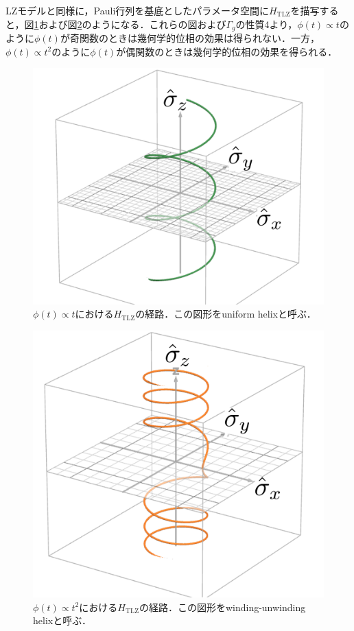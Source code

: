 LZモデルと同様に，Pauli行列を基底としたパラメータ空間に$H_{\mathrm{TLZ}}$を描写すると，図\ref{fig:uniform_helix}および図\ref{fig:winding_helix}のようになる．これらの図および$\Gamma_g$の性質4より，$\phi(t) \propto t$のように$\phi(t)$が奇関数のときは幾何学的位相の効果は得られない．一方，$\phi(t) \propto t^2$のように$\phi(t)$が偶関数のときは幾何学的位相の効果を得られる．

\begin{figure}[htbp]
  \centering
  \includegraphics[scale=0.8]{figures/uniform_helix.png}
  \caption{$\phi(t) \propto t$における$H_{\mathrm{TLZ}}$の経路．この図形をuniform helixと呼ぶ．}
  \label{fig:uniform_helix}
\end{figure}

\begin{figure}[htbp]
  \centering
  \includegraphics[scale=0.8]{figures/winding_helix.png}
  \caption{$\phi(t) \propto t^2$における$H_{\mathrm{TLZ}}$の経路．この図形をwinding-unwinding helixと呼ぶ．}
  \label{fig:winding_helix}
\end{figure}

